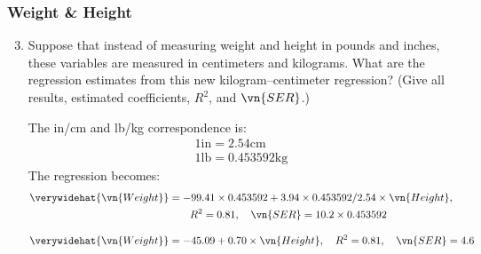 \begin{frame}
\frametitle{Weight \& Height}
\ask 

\begin{enumerate}\setcounter{enumi}{2}

\item Suppose that instead of measuring weight and height in pounds and inches, these variables are measured in centimeters and kilograms. What are the regression estimates from this new kilogram–centimeter regression? (Give all results, estimated coefficients, $R^{2}$, and $\vn{SER}$.)

\begin{answer}
The in/cm and lb/kg correspondence is:
\begin{align*}
1 \text{in} = 2.54 \text{cm}\\
1 \text{lb} = 0.453592\text{kg}
\end{align*}
The regression becomes:
\begin{align*}
\verywidehat{\vn{Weight}} 
  & = -99.41 \times 0.453592 + 3.94 \times 0.453592/2.54 \times \vn{Height}, \\
  & \qquad R^2 = 0.81,
  \quad \vn{SER} = 10.2 \times 0.453592\\[2ex]
\verywidehat{\vn{Weight}} 
  & = -45.09 + 0.70 \times \vn{Height},
  \quad R^2 = 0.81,
  \quad \vn{SER} = 4.6
\end{align*}
\end{answer}

\end{enumerate}
\end{frame}




